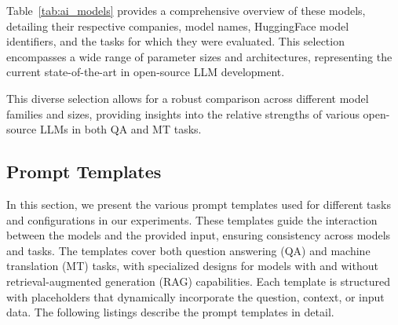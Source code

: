 Table~\ref{tab:ai_models} provides a comprehensive overview of these models, detailing their respective companies, model names, HuggingFace model identifiers, and the tasks for which they were evaluated. This selection encompasses a wide range of parameter sizes and architectures, representing the current state-of-the-art in open-source LLM development.

This diverse selection allows for a robust comparison across different model families and sizes, providing insights into the relative strengths of various open-source LLMs in both QA and MT tasks.

\begin{table}[htbp]
\caption{Overview of Large Language Models and Their Specifications by Task}
\label{tab:ai_models}
\centering
{}
\end{table}
\fi


\subsection{Prompt Templates}
\label{sec:prompt}
In this section, we present the various prompt templates used for different tasks and configurations in our experiments. These templates guide the interaction between the models and the provided input, ensuring consistency across models and tasks. The templates cover both question answering (QA) and machine translation (MT) tasks, with specialized designs for models with and without retrieval-augmented generation (RAG) capabilities. Each template is structured with placeholders that dynamically incorporate the question, context, or input data. The following listings describe the prompt templates in detail.


